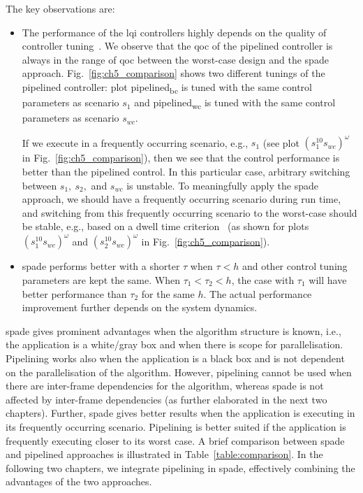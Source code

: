 The key observations are:
\begin{itemize}
    \item The performance of the \gls{lqi} controllers highly depends on the quality of controller tuning~\cite{medina2019designing}. We observe that the \gls{qoc} of the pipelined controller is always in the range of \gls{qoc} between the worst-case design and the \gls{spade} approach. Fig.~\ref{fig:ch5_comparison} shows two different tunings of the pipelined controller: plot pipelined\textsubscript{bc} is tuned with the same control parameters as scenario $s_1$ and pipelined\textsubscript{wc} is tuned with the same control parameters as scenario $s_{wc}$.
    
If we execute in a frequently occurring scenario, e.g., $s_1$ (see plot $(s_1^{10}s_{wc})^\omega$ in Fig.~\ref{fig:ch5_comparison}), then we see that the control performance is better than the pipelined control. In this particular case, arbitrary switching between $s_1,\ s_2,$ and $s_{wc}$ is unstable. To meaningfully apply the \gls{spade} approach, we should have a frequently occurring scenario during run time, and switching from this frequently occurring scenario to the worst-case should be stable, e.g., based on a dwell time criterion~\cite{12_sunstability} (as shown for plots $(s_1^{10}s_{wc})^\omega$ and $(s_2^{10}s_{wc})^\omega$ in Fig.~\ref{fig:ch5_comparison}).
\item \gls{spade} performs better with a shorter $\tau$ when $\tau<h$ and other control tuning parameters are kept the same. When $\tau_1<\tau_2<h$, the case with $\tau_1$ will have better performance than $\tau_2$ for the same $h$.  The actual performance improvement further depends on the system dynamics.
\end{itemize}

\gls{spade} gives prominent advantages when the algorithm structure is known, i.e., the application is a white/gray box and when there is scope for parallelisation.
Pipelining works also when the application is a black box and is not dependent on the parallelisation of the algorithm. However, pipelining cannot be used when there are inter-frame dependencies for the algorithm, whereas \gls{spade} is not affected by  inter-frame dependencies (as further elaborated in the next two chapters).
Further, \gls{spade} gives better results when the application is executing in its frequently occurring scenario. Pipelining is better suited if the application is frequently executing closer to its worst case. A brief comparison between \gls{spade} and pipelined approaches is illustrated in Table~\ref{table:comparison}. In the following two chapters, we integrate pipelining in \gls{spade}, effectively combining the advantages of the two approaches.

